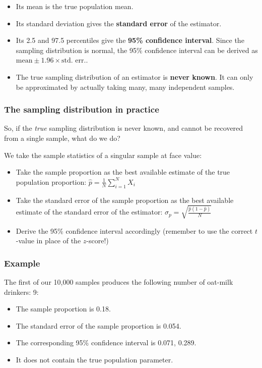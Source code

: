 \documentclass[
  11pt,
]{article}
\providecommand{\tightlist}{%
  \setlength{\itemsep}{0pt}\setlength{\parskip}{0pt}}
\begin{document}
\begin{itemize}
\tightlist
\item
  Its mean is the true population mean.
\item
  Its standard deviation gives the \textbf{standard error} of the estimator.
\item
  Its 2.5 and 97.5 percentiles give the \textbf{95\% confidence interval}. Since the sampling distribution is normal, the 95\% confidence interval can be derived as \(\text{mean} \pm 1.96 \times \text{std. err.}\).
\item
  The true sampling distribution of an estimator is \textbf{never known}. It can only be approximated by actually taking many, many independent samples.
\end{itemize}

\hypertarget{the-sampling-distribution-in-practice}{%
\subsubsection{The sampling distribution in practice}\label{the-sampling-distribution-in-practice}}

So, if the \emph{true} sampling distribution is never known, and cannot be recovered from a single sample, what do we do?

We take the sample statistics of a singular sample at face value:

\begin{itemize}
\tightlist
\item
  Take the sample proportion as the best available estimate of the true population proportion: \(\hat{p} = \frac{1}{N}\sum_{i=1}^{N} X_i\)
\item
  Take the standard error of the sample proportion as the best available estimate of the standard error of the estimator: \(\hat{\sigma}_p = \sqrt{\frac{\hat{p} (1- \hat{p})}{N}}\)
\item
  Derive the 95\% confidence interval accordingly (remember to use the correct \(t\)-value in place of the \(z\)-score!)
\end{itemize}

\hypertarget{example}{%
\subsubsection{Example}\label{example}}

The first of our 10,000 samples produces the following number of oat-milk drinkers: 9:

\begin{itemize}
\tightlist
\item
  The sample proportion is 0.18.
\item
  The standard error of the sample proportion is 0.054.
\item
  The corresponding 95\% confidence interval is 0.071, 0.289.
\item
  It does not contain the true population parameter.
\end{itemize}
\end{document}

